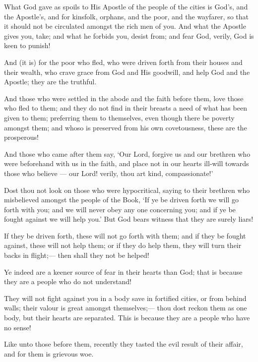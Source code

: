 \documentclass[fontsize=14pt, letterpaper, notitlepage, openany, DIV=12]{scrbook} %
\begin{document}
\noindent[59:7]
What God gave as spoils to His Apostle of the people of the cities is God's, and the
Apostle's, and for kinsfolk, orphans, and the poor, and the wayfarer, so that it should not be
circulated amongst the rich men of you. And what the Apostle gives you, take; and what he
forbids you, desist from; and fear God, verily, God is keen to punish!

\noindent[59:8]
And (it is) for the poor who fled, who were driven forth from their houses and their
wealth, who crave grace from God and His goodwill, and help God and the Apostle; they are the
truthful.

\noindent[59:9]
And those who were settled in the abode and the faith before them, love those who fled to
them; and they do not find in their breasts a need of what has been given to them; preferring
them to themselves, even though there be poverty amongst them; and whoso is preserved from
his own covetousness, these are the prosperous!

\noindent[59:10]
And those who came after them say, `Our Lord, forgive us and our brethren who were
beforehand with us in the faith, and place not in our hearts ill-will towards those who believe ---
our Lord! verily, thou art kind, compassionate!'

\noindent[59:11]
Dost thou not look on those who were hypocritical, saying to their brethren who
misbelieved amongst the people of the Book, `If ye be driven forth we will go forth with you;
and we will never obey any one concerning you; and if ye be fought against we will help you.'
But God bears witness that they are surely liars!

\noindent[59:12]
If they be driven forth, these will not go forth with them; and if they be fought against,
these will not help them; or if they do help them, they will turn their backs in flight;--- then shall
they not be helped!

\noindent[59:13]
Ye indeed are a keener source of fear in their hearts than God; that is because they are a
people who do not understand!

\noindent[59:14]
They will not fight against you in a body save in fortified cities, or from behind walls;
their valour is great amongst themselves;--- thou dost reckon them as one body, but their hearts
are separated. This is because they are a people who have no sense!

\noindent[59:15]
Like unto those before them, recently they tasted the evil result of their affair, and for
them is grievous woe.
\end{document}
